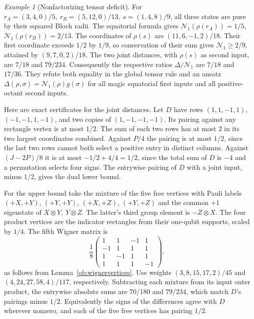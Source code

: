 \documentclass[aps,pra,onecolumn,superscriptaddress,nofootinbib,10pt]{revtex4-2}
\theoremstyle{definition}
\theoremstyle{remark}
\newtheorem{example}[theorem]{Example}
\begin{document}
\begin{example}[Nonfactorizing tensor deficit]\label{ob:wignerdeficit}
For \(r_A=(3,4,0)/5,\ r_B=(5,12,0)/13,\ s=(1,4,8)/9\), all
three states are pure by their squared Bloch radii. The equatorial
formula gives \(\mathcal N_1(\rho(r_A))=1/5\), \(\mathcal N_1(\rho(r_B))=2/13\).
The coordinates of \(\rho(s)\) are \((11,6,-1,2)/18\).
Their first coordinate exceeds \(1/2\) by \(1/9\), so conservation
of their sum gives \(\mathcal N_1\ge2/9\), attained by \((9,7,0,2)/18\).
The two joint distances, with \(\rho(s)\) as second input, are
\(7/18\) and \(79/234\). Consequently the respective ratios
\(\Delta/\mathcal N_1\) are \(7/18\) and \(17/36\). They refute both equality
in the global tensor rule and an ansatz
\(\Delta(\rho,\sigma)=\mathcal N_1(\rho)g(\sigma)\) for all magic equatorial
first inputs and all positive-octant second inputs.

Here are exact certificates for the joint distances. Let \(D\)
have rows \((1,1,-1,1)\), \((-1,-1,1,-1)\), and two copies of
\((1,-1,-1,-1)\). Its pairing against any rectangle vertex is
at most \(1/2\). The sum of each two rows has at most \(2\) in
its two largest coordinates combined. Against \(P/4\) the pairing
is at most \(1/2\), since the last two rows cannot both select a
positive entry in distinct columns. Against \((J-2P)/8\) it is
at most \(-1/2+4/4=1/2\), since the total sum of \(D\) is
\(-4\) and a permutation selects four signs. The entrywise
pairing of \(D\) with a joint input, minus \(1/2\), gives the
dual lower bound.

For the upper bound take the mixture of the five free vertices
with Pauli labels
\((+X,+Y)\), \((+Y,+Y)\), \((+X,+Z)\), \((+Y,+Z)\) and the common \(+1\)
eigenstate of \(X\otimes Y,\ Y\otimes Z\). The latter's third
group element is \(-Z\otimes X\). The four product vertices
are the indicator rectangles from their one-qubit supports, scaled
by \(1/4\). The fifth Wigner matrix is
\[
 \frac18\begin{pmatrix}
 1&1&-1&1\\ -1&1&1&1\\ 1&-1&1&1\\ 1&1&1&-1
 \end{pmatrix},
\]
as follows from Lemma~\ref{ob:wignervertices}.
Use weights \((3,8,15,17,2)/45\) and \((4,24,27,58,4)/117\),
respectively. Subtracting each mixture from its input outer product,
the entrywise absolute sums are \(70/180\) and \(79/234\),
which match \(D\)'s pairings minus \(1/2\). Equivalently the signs
of the differences agree with \(D\) wherever nonzero, and each
of the five free vertices has pairing \(1/2\).
\end{example}
\end{document}
